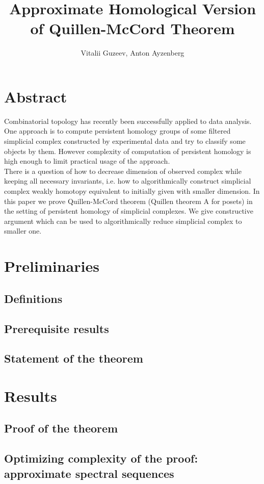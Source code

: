 \documentclass[a4paper, 12pt]{article}
\title{Approximate Homological Version of Quillen-McCord Theorem}
\author{Vitalii Guzeev, Anton Ayzenberg}
\theoremstyle{definition}
\theoremstyle{remark}
\begin{document}
\section{Abstract}

Combinatorial topology has recently been successfully applied to data analysis. One approach is to compute persistent homology groups of some filtered simplicial complex constructed by experimental data and try to classify some objects by them. However complexity of computation of persistent homology is high enough to limit practical usage of the approach.\\

There is a question of how to decrease dimension of observed complex while keeping all necessary invariants, i.e. how to algorithmically construct simplicial complex weakly homotopy equivalent to initially given with smaller dimension. In this paper we prove Quillen-McCord theorem (Quillen theorem A for posets) in the setting of persistent homology of simplicial complexes. We give constructive argument which can be used to algorithmically reduce simplicial complex to smaller one.

\section{Preliminaries}

\subsection{Definitions}

\subsection{Prerequisite results}

\subsection{Statement of the theorem}

\section{Results}

\subsection{Proof of the theorem}

\subsection{Optimizing complexity of the proof: approximate spectral sequences}
\end{document}
